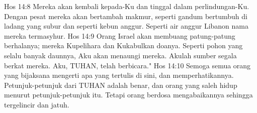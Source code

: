 Hos 14:8  Mereka akan kembali kepada-Ku dan tinggal dalam perlindungan-Ku. Dengan pesat mereka akan bertambah makmur, seperti gandum bertumbuh di ladang yang subur dan seperti kebun anggur. Seperti air anggur Libanon nama mereka termasyhur.
Hos 14:9  Orang Israel akan membuang patung-patung berhalanya; mereka Kupelihara dan Kukabulkan doanya. Seperti pohon yang selalu banyak daunnya, Aku akan menaungi mereka. Akulah sumber segala berkat mereka. Aku, TUHAN, telah berbicara."
Hos 14:10  Semoga semua orang yang bijaksana mengerti apa yang tertulis di sini, dan memperhatikannya. Petunjuk-petunjuk dari TUHAN adalah benar, dan orang yang saleh hidup menurut petunjuk-petunjuk itu. Tetapi orang berdosa mengabaikannya sehingga tergelincir dan jatuh.


